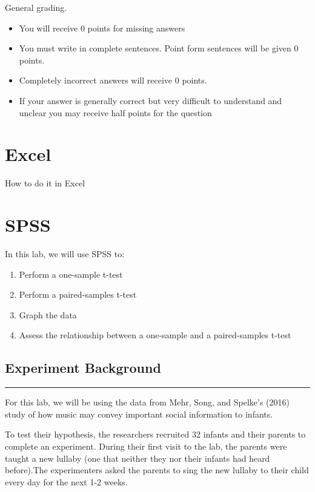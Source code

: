 \documentclass[
]{book}
\providecommand{\tightlist}{%
  \setlength{\itemsep}{0pt}\setlength{\parskip}{0pt}}
\begin{document}
General grading.

\begin{itemize}
\tightlist
\item
  You will receive 0 points for missing answers
\item
  You must write in complete sentences. Point form sentences will be given 0 points.
\item
  Completely incorrect answers will receive 0 points.
\item
  If your answer is generally correct but very difficult to understand and unclear you may receive half points for the question
\end{itemize}

\hypertarget{excel-6}{%
\section{Excel}\label{excel-6}}

How to do it in Excel

\hypertarget{spss-6}{%
\section{SPSS}\label{spss-6}}

In this lab, we will use SPSS to:

\begin{enumerate}
\def\labelenumi{\arabic{enumi}.}
\tightlist
\item
  Perform a one-sample t-test
\item
  Perform a paired-samples t-test
\item
  Graph the data
\item
  Assess the relationship between a one-sample and a paired-samples t-test
\end{enumerate}

\hypertarget{experiment-background-1}{%
\subsection{Experiment Background}\label{experiment-background-1}}

\begin{center}\rule{0.5\linewidth}{0.5pt}\end{center}

For this lab, we will be using the data from Mehr, Song, and Spelke's (2016) study of how music may convey important social information to infants.

To test their hypothesis, the researchers recruited 32 infants and their parents to complete an experiment. During their first visit to the lab, the parents were taught a new lullaby (one that neither they nor their infants had heard before).The experimenters asked the parents to sing the new lullaby to their child every day for the next 1-2 weeks.
\end{document}
